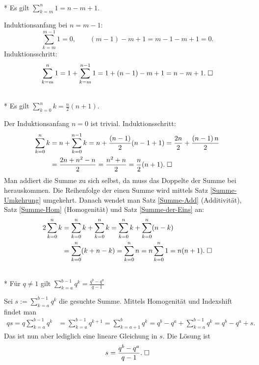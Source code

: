 \begin{Satz}%
\label{Summe-der-Eins}\mbox{}\\*
Es gilt
$\sum_{k=m}^n 1 = n-m+1$.
\end{Satz}
 Induktionsanfang bei $n=m-1$:
\[\sum_{k=m}^{m-1} 1=0,\qquad (m-1)-m+1 = m-1-m+1 = 0.\]
Induktionsschritt:
\[\sum_{k=m}^n 1 = 1+\sum_{k=m}^{n-1} 1 = 1+(n-1)-m+1 = n-m+1.\;\Box\]

\newpage
\begin{Satz}%
\label{Partialsumme-arith}\mbox{}\\*
Es gilt $\sum_{k=0}^n k = \frac{n}{2}(n+1)$.
\end{Satz}
 Der Induktionsanfang $n=0$ ist trivial.
Induktionsschritt:%
\begin{align*}
\sum_{k=0}^n k &= n+\sum_{k=0}^{n-1} k = n+\frac{(n-1)}{2}(n-1+1)
= \frac{2n}{2}+\frac{(n-1)\,n}{2}\\
&= \frac{2n+n^2-n}{2} = \frac{n^2+n}{2}
= \frac{n}{2}(n+1).\;\Box
\end{align*}
 Man addiert die Summe
zu sich selbst, da muss das Doppelte der Summe bei herauskommen.
Die Reihenfolge der einen Summe wird mittels Satz \ref{Summe-Umkehrung}
umgekehrt. Danach wendet man Satz \ref{Summe-Add} (Additivität),
Satz \ref{Summe-Hom} (Homogenität) und Satz \ref{Summe-der-Eins} an:%
\begin{align*}
2\sum_{k=0}^n k &= \sum_{k=0}^n k+\sum_{k=0}^n k
= \sum_{k=0}^n k + \sum_{k=0}^n (n-k)\\
&= \sum_{k=0}^n (k+n-k) = \sum_{k=0}^n n
= n\sum_{k=0}^n 1 = n(n+1).\;\Box
\end{align*}

\begin{Satz}\mbox{}\\*
Für $q\ne 1$ gilt $\sum_{k=a}^{b-1} q^k = \frac{q^b-q^a}{q-1}$
\end{Satz}
Sei $s:=\sum_{k=a}^{b-1} q^k$ die gesuchte Summe.
Mittels Homogenität und Indexshift findet man
\begin{align*}
qs = q\sum_{k=a}^{b-1} q^k &= \sum_{k=a}^{b-1} q^{k+1} = \sum_{k=a+1}^b q^k = q^b-q^a+\sum_{k=a}^{b-1} q^k
= q^b-q^a+s.
\end{align*}
Das ist nun aber lediglich eine lineare Gleichung in $s$. Die Lösung ist
\[s = \frac{q^b-q^a}{q-1}.\;\Box\]

